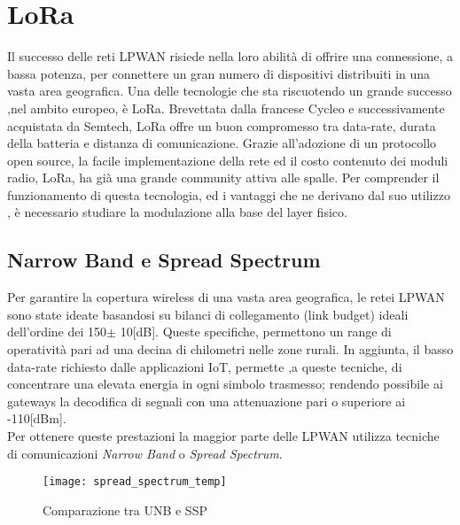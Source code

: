 \chapter{LoRa}
Il successo delle reti LPWAN risiede nella loro abilità di offrire una
connessione, a bassa potenza, per connettere un gran numero di  dispositivi distribuiti in una
vasta area geografica. 
Una delle  tecnologie che sta riscuotendo un grande successo ,nel
ambito europeo, è LoRa.
Brevettata dalla francese Cycleo e successivamente acquistata da Semtech, LoRa 
 offre un buon compromesso tra data-rate,
durata della batteria e distanza di comunicazione.
Grazie all'adozione di un protocollo open source, la facile implementazione della rete
ed il costo contenuto dei moduli radio, LoRa, ha già una grande community attiva alle
spalle. Per comprender il funzionamento di questa tecnologia, ed i vantaggi che ne
derivano dal suo utilizzo , è necessario
studiare la modulazione alla base del layer fisico.

\section{Narrow Band e Spread Spectrum}
Per garantire la copertura wireless di una vasta area geografica, le retei LPWAN 
sono state ideate basandosi su  bilanci di
collegamento (link budget) ideali  dell'ordine dei 150$\pm$ 10[dB]. 
Queste specifiche, permettono  un range di operatività
pari ad una decina di chilometri nelle zone rurali. 
In aggiunta, il basso data-rate richiesto dalle applicazioni IoT, permette ,a
queste tecniche, di concentrare una elevata energia in
ogni simbolo trasmesso; rendendo possibile ai gateways la decodifica di 
segnali con una attenuazione pari o superiore ai -110[dBm].\\
Per ottenere queste
prestazioni la maggior parte delle LPWAN  utilizza tecniche di comunicazioni
\emph{Narrow Band} o \emph{Spread Spectrum}.

\begin{figure}[ht]
\centering 
\texttt{[image: spread\_spectrum\_temp]}
\caption{Comparazione tra UNB e SSP}
\end{figure}

